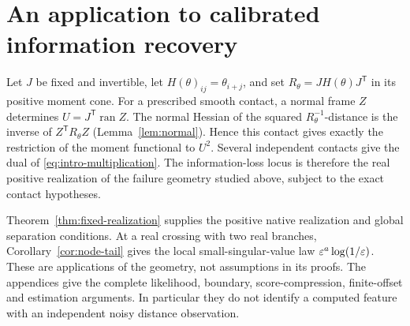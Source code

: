 \section{An application to calibrated information recovery}
\label{sec:application-bridge}
Let $J$ be fixed and invertible, let $H(\theta)_{ij}=\theta_{i+j}$,
and set $R_\theta=JH(\theta)J^{\mathsf T}$ in its positive moment
cone. For a prescribed smooth contact, a normal frame $Z$ determines
$U=J^{\mathsf T}\operatorname{ran}Z$. The normal Hessian of the
squared $R_\theta^{-1}$-distance is the inverse of
$Z^{\mathsf T}R_\theta Z$ (Lemma~\ref{lem:normal}). Hence this
contact gives exactly the restriction of the moment functional to
$U^2$. Several independent contacts give the dual of
\eqref{eq:intro-multiplication}. The information-loss locus is
therefore the real positive realization of the failure geometry
studied above, subject to the exact contact hypotheses.

Theorem~\ref{thm:fixed-realization} supplies the positive native
realization and global separation conditions. At a real crossing
with two real branches, Corollary~\ref{cor:node-tail} gives the local
small-singular-value law $\varepsilon^a\log(1/\varepsilon)$. These are applications
of the geometry, not assumptions in its proofs. The appendices give
the complete likelihood, boundary, score-compression, finite-offset
and estimation arguments. In particular they do not identify a
computed feature with an independent noisy distance observation.

